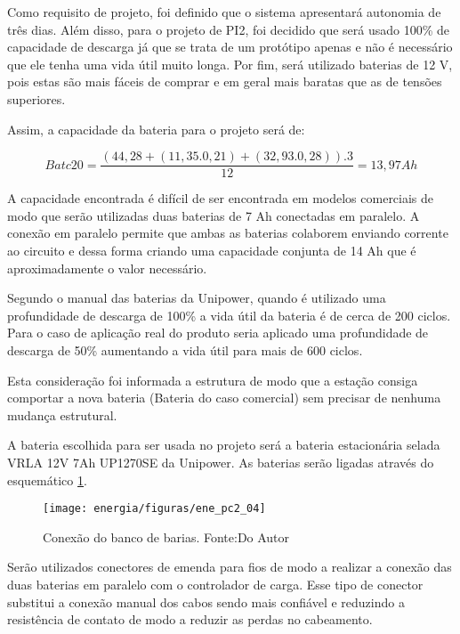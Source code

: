 	Como requisito de projeto, foi definido que o sistema apresentará autonomia de três dias. Além disso, para o projeto de PI2, foi decidido que será usado 100\% de capacidade de descarga já que se trata de um protótipo apenas e não é necessário que ele tenha uma vida útil muito longa. Por fim, será utilizado baterias de 12 V, pois estas são mais fáceis de comprar e em geral mais baratas que as de tensões superiores.
	
Assim, a capacidade da bateria para o projeto será de:

\begin{equation}
Batc20 = \dfrac{(44,28 + (11,35 . 0,21) + (32,93 . 0,28)) . 3}{12} = 13,97 Ah 
\end{equation}

	A capacidade encontrada é difícil de ser encontrada em modelos comerciais de modo que serão utilizadas duas baterias de 7 Ah conectadas em paralelo. A conexão em paralelo permite que ambas as baterias colaborem enviando corrente ao circuito e dessa forma criando uma capacidade conjunta de 14 Ah que é aproximadamente o valor necessário.
	
	Segundo o manual das baterias da Unipower, quando é utilizado uma profundidade de descarga de 100\% a vida útil da bateria é de cerca de 200 ciclos. Para o caso de aplicação real do produto seria aplicado uma profundidade de descarga de 50\% aumentando a vida útil para mais de 600 ciclos. \cite{unipower}
	
	Esta consideração foi informada a estrutura de modo que a estação consiga comportar a nova bateria (Bateria do caso comercial) sem precisar de nenhuma mudança estrutural. 
	
	A bateria escolhida para ser usada no projeto será a bateria estacionária selada VRLA 12V 7Ah UP1270SE da Unipower. As baterias serão ligadas através do esquemático \ref{ene_pc2_04}.
	
\begin{figure}[H]
		\centering
		\texttt{[image: energia/figuras/ene\_pc2\_04]}
		\caption{Conexão do banco de barias. Fonte:Do Autor}
		\label{ene_pc2_04}
\end{figure}

	Serão utilizados conectores de emenda para fios de modo a realizar a conexão das duas baterias em paralelo com o controlador de carga. Esse tipo de conector substitui a conexão manual dos cabos sendo mais confiável e reduzindo a resistência de contato de modo a reduzir as perdas no cabeamento.
	
